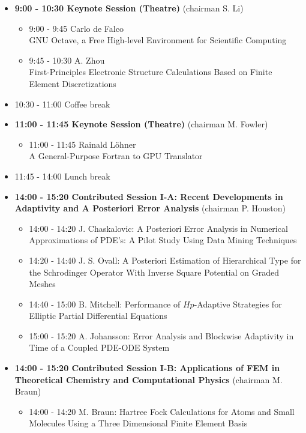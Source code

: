 \documentclass[10pt]{article}%
\begin{document}
\begin{itemize}    
  \item {\bf 9:00 - 10:30 Keynote Session (Theatre)} (chairman S. Li) 
  \begin{itemize}
    \item 9:00 - 9:45 {Carlo de Falco}\\{GNU Octave, a Free High-level Environment for Scientific Computing}
    \item 9:45 - 10:30 {A. Zhou}\\{First-Principles Electronic Structure Calculations Based on Finite Element Discretizations}
  \end{itemize}
  \item 10:30 - 11:00 Coffee break
  \item {\bf 11:00 - 11:45 Keynote Session (Theatre)} (chairman M. Fowler)
  \begin{itemize}
    \item 11:00 - 11:45 {Rainald L\"{o}hner}\\A General-Purpose Fortran to GPU Translator
  \end{itemize}
  \item 11:45 - 14:00 Lunch break      
  \item {\bf 14:00 - 15:20 Contributed Session I-A: Recent Developments in Adaptivity and A Posteriori Error Analysis} (chairman P. Houston) 
  \begin{itemize}
    \item 14:00 - 14:20 {J. Chaskalovic}: {A Posteriori Error Analysis in Numerical Approximations of PDE's: A Pilot Study Using Data Mining Techniques} %
    \item 14:20 - 14:40 {J. S. Ovall}: {A Posteriori Estimation of Hierarchical Type for the  Schrodinger Operator With Inverse Square Potential on Graded Meshes}
    \item 14:40 - 15:00 {B. Mitchell}: {Performance of $Hp$-Adaptive Strategies for Elliptic Partial Differential Equations}
    \item 15:00 - 15:20 {A. Johansson}: {Error Analysis and Blockwise Adaptivity in Time of a Coupled PDE-ODE System} 
  \end{itemize}
  \item {\bf 14:00 - 15:20 Contributed Session I-B: Applications of FEM in Theoretical Chemistry and Computational Physics} (chairman M. Braun) 
  \begin{itemize}
    \item 14:00 - 14:20 {M. Braun}: {Hartree Fock Calculations for Atoms and Small Molecules Using  a Three Dimensional Finite Element Basis}

\end{itemize}
\end{itemize}
\end{document}
